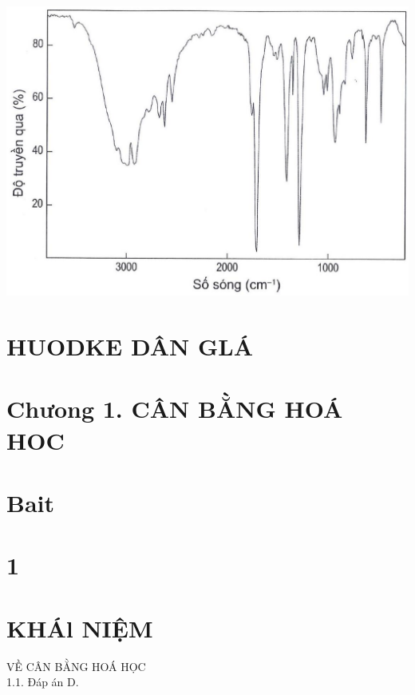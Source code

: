 \documentclass[10pt]{article}
\begin{document}
\captionsetup{singlelinecheck=false}
\begin{center}
\includegraphics[max width=\textwidth]{2025_10_23_adad5b98d65ac6665838g-01}
\end{center}

\section*{HUODKE DÂN GLÁ}
\section*{Chưong 1. CÂN BẰNG HOÁ HOC}
\section*{Bait}
\section*{1}
\section*{KHÁl NIỆM}
VỀ CÂN BẰNG HOÁ HỌC\\
1.1. Đáp án D.
\end{document}
